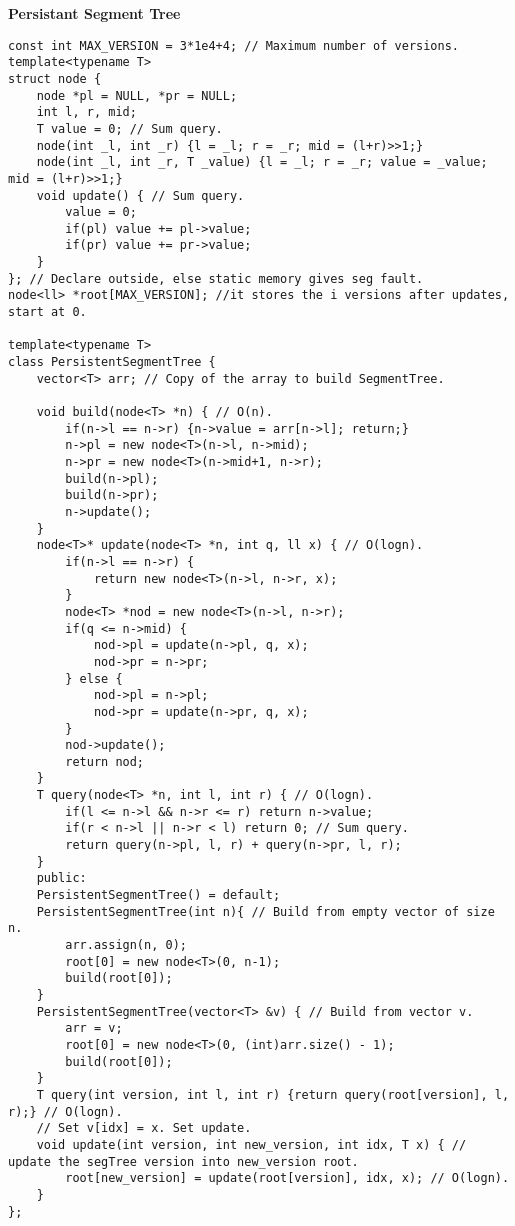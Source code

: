 \documentclass[a4paper,10pt]{article}
\newcommand{\titleAlg}[1]{\vspace{-10pt}
\begin{center}\textbf{#1}\end{center} \vspace{-10pt}}
\begin{document}
\titleAlg{Persistant Segment Tree}
\begin{multicols}{2}
\begin{verbatim}
const int MAX_VERSION = 3*1e4+4; // Maximum number of versions.
template<typename T>
struct node {
    node *pl = NULL, *pr = NULL;
    int l, r, mid;
    T value = 0; // Sum query.
    node(int _l, int _r) {l = _l; r = _r; mid = (l+r)>>1;}
    node(int _l, int _r, T _value) {l = _l; r = _r; value = _value; mid = (l+r)>>1;}
    void update() { // Sum query.
        value = 0;
        if(pl) value += pl->value;
        if(pr) value += pr->value;
    }
}; // Declare outside, else static memory gives seg fault.
node<ll> *root[MAX_VERSION]; //it stores the i versions after updates, start at 0.

template<typename T>
class PersistentSegmentTree {
    vector<T> arr; // Copy of the array to build SegmentTree.

    void build(node<T> *n) { // O(n).
        if(n->l == n->r) {n->value = arr[n->l]; return;}
        n->pl = new node<T>(n->l, n->mid);
        n->pr = new node<T>(n->mid+1, n->r);
        build(n->pl);
        build(n->pr);
        n->update();
    }
    node<T>* update(node<T> *n, int q, ll x) { // O(logn).
        if(n->l == n->r) {
            return new node<T>(n->l, n->r, x);
        }
        node<T> *nod = new node<T>(n->l, n->r);
        if(q <= n->mid) {
            nod->pl = update(n->pl, q, x);
            nod->pr = n->pr;
        } else {
            nod->pl = n->pl;
            nod->pr = update(n->pr, q, x);
        }
        nod->update();
        return nod;
    }
    T query(node<T> *n, int l, int r) { // O(logn).
        if(l <= n->l && n->r <= r) return n->value;
        if(r < n->l || n->r < l) return 0; // Sum query.
        return query(n->pl, l, r) + query(n->pr, l, r);
    }
    public:
    PersistentSegmentTree() = default;
    PersistentSegmentTree(int n){ // Build from empty vector of size n.
        arr.assign(n, 0);
        root[0] = new node<T>(0, n-1);
        build(root[0]);
    }
    PersistentSegmentTree(vector<T> &v) { // Build from vector v.
        arr = v;
        root[0] = new node<T>(0, (int)arr.size() - 1);
        build(root[0]);
    }
    T query(int version, int l, int r) {return query(root[version], l, r);} // O(logn).
    // Set v[idx] = x. Set update.
    void update(int version, int new_version, int idx, T x) { // update the segTree version into new_version root.
        root[new_version] = update(root[version], idx, x); // O(logn).
    }
};


\end{verbatim}
\end{multicols}
\end{document}
